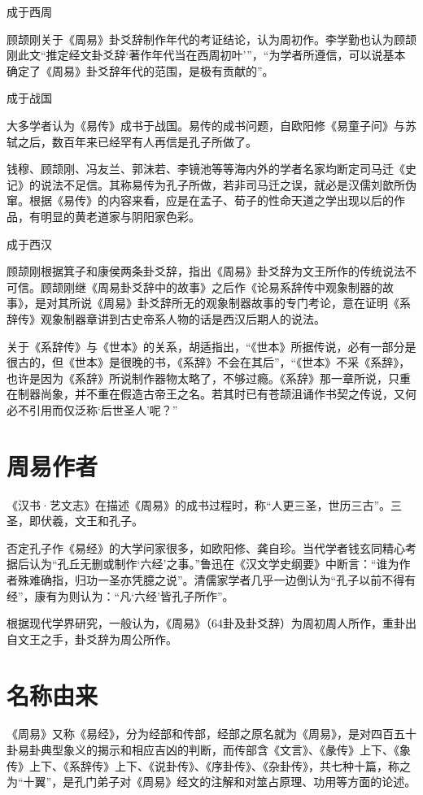 \documentclass[a4paper,12pt,UTF8,twoside]{ctexbook}
\begin{document}
成于西周

顾颉刚关于《周易》卦爻辞制作年代的考证结论，认为周初作。李学勤也认为顾颉刚此文“推定经文卦爻辞‘著作年代当在西周初叶’”，“为学者所遵信，可以说基本确定了《周易》卦爻辞年代的范围，是极有贡献的”。

成于战国

大多学者认为《易传》成书于战国。易传的成书问题，自欧阳修《易童子问》与苏轼之后，数百年来已经罕有人再信是孔子所做了。

钱穆、顾颉刚、冯友兰、郭沫若、李镜池等等海内外的学者名家均断定司马迁《史记》的说法不足信。其称易传为孔子所做，若非司马迁之误，就必是汉儒刘歆所伪窜。根据《易传》的内容来看，应是在孟子、荀子的性命天道之学出现以后的作品，有明显的黄老道家与阴阳家色彩。

成于西汉

顾颉刚根据箕子和康侯两条卦爻辞，指出《周易》卦爻辞为文王所作的传统说法不可信。顾颉刚继《周易卦爻辞中的故事》之后作《论易系辞传中观象制器的故事》，是对其所说《周易》卦爻辞所无的观象制器故事的专门考论，意在证明《系辞传》观象制器章讲到古史帝系人物的话是西汉后期人的说法。

关于《系辞传》与《世本》的关系，胡适指出，“《世本》所据传说，必有一部分是很古的，但《世本》是很晚的书，《系辞》不会在其后”，“《世本》不采《系辞》，也许是因为《系辞》所说制作器物太略了，不够过瘾。《系辞》那一章所说，只重在制器尚象，并不重在假造古帝王之名。若其时已有苍颉沮诵作书契之传说，又何必不引用而仅泛称‘后世圣人’呢？”

\section{周易作者}

《汉书·艺文志》在描述《周易》的成书过程时，称“人更三圣，世历三古”。三圣，即伏羲，文王和孔子。

否定孔子作《易经》的大学问家很多，如欧阳修、龚自珍。当代学者钱玄同精心考据后认为“孔丘无删或制作‘六经’之事。”鲁迅在《汉文学史纲要》中断言：“谁为作者殊难确指，归功一圣亦凭臆之说”。清儒家学者几乎一边倒认为“孔子以前不得有经”，康有为则认为：“凡‘六经’皆孔子所作”。

根据现代学界研究，一般认为，《周易》（64卦及卦爻辞）为周初周人所作，重卦出自文王之手，卦爻辞为周公所作。

\section{名称由来}

《周易》又称《易经》，分为经部和传部，经部之原名就为《周易》，是对四百五十卦易卦典型象义的揭示和相应吉凶的判断，而传部含《文言》、《彖传》上下、《象传》上下、《系辞传》上下、《说卦传》、《序卦传》、《杂卦传》，共七种十篇，称之为“十翼”，是孔门弟子对《周易》经文的注解和对筮占原理、功用等方面的论述。
\end{document}
